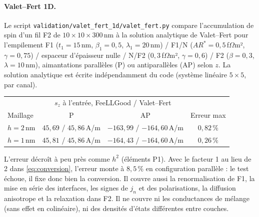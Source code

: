 \documentclass[11pt,a4paper]{article}
\begin{document}
\paragraph{Valet--Fert 1D.} Le script
\texttt{validation/valet\_fert\_1d/valet\_fert.py} compare l'accumulation
de spin d'un fil F2 de $10\times10\times300$\,nm à la solution analytique
de Valet--Fert pour l'empilement F1 ($t_1=15$\,nm, $\beta_1=0{,}5$,
$\lambda_1=20$\,nm) / F1/N ($AR^*=0{,}5$\,f$\Omega$m², $\gamma=0{,}75$) /
espaceur d'épaisseur nulle / N/F2 ($0{,}3$\,f$\Omega$m², $\gamma=0{,}6$) /
F2 ($\beta=0{,}3$, $\lambda=10$\,nm), aimantations parallèles (P) ou
antiparallèles (AP) selon $z$. La solution analytique est écrite
indépendamment du code (système linéaire $5\times5$, par canal).
\begin{center}
\renewcommand{\arraystretch}{1.2}
\begin{tabular}{lccc}
  \toprule
  & \multicolumn{2}{c}{$s_z$ à l'entrée, FeeLLGood / Valet--Fert} & \\
  Maillage & P & AP & Erreur max \\
  \midrule
  $h=2$\,nm & $45{,}69$ / $45{,}86$\,A/m & $-163{,}99$ / $-164{,}60$\,A/m & $0{,}82\,\%$ \\
  $h=1$\,nm & $45{,}81$ / $45{,}86$\,A/m & $-164{,}43$ / $-164{,}60$\,A/m & $0{,}26\,\%$ \\
  \bottomrule
\end{tabular}
\end{center}
L'erreur décroît à peu près comme $h^2$ (éléments P1). Avec le facteur 1
au lieu de 2 dans \eqref{eq:conversion}, l'erreur monte à $8{,}5\,\%$ en
configuration parallèle : le test échoue, il fixe donc bien la conversion.
Il couvre aussi la renormalisation de F1, la mise en série des interfaces,
les signes de $j_n$ et des polarisations, la diffusion anisotrope et la
relaxation dans F2. Il ne couvre ni les conductances de mélange (sans effet
en colinéaire), ni des densités d'états différentes entre couches.
\end{document}
